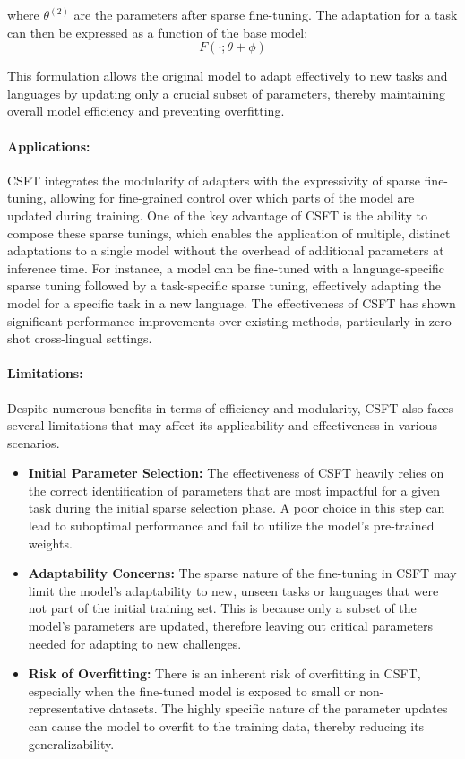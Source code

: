 where $\theta^{(2)}$ are the parameters after sparse fine-tuning. The adaptation for a task can then be expressed as a function of the base model:
\begin{equation}
	F(\cdot; \theta + \phi)
\end{equation}

This formulation allows the original model to adapt effectively to new tasks and languages by updating only a crucial subset of parameters, thereby maintaining overall model efficiency and preventing overfitting.

\paragraph{Applications:} CSFT integrates the modularity of adapters with the expressivity of sparse fine-tuning, allowing for fine-grained control over which parts of the model are updated during training. One of the key advantage of CSFT is the ability to compose these sparse tunings, which enables the application of multiple, distinct adaptations to a single model without the overhead of additional parameters at inference time. For instance, a model can be fine-tuned with a language-specific sparse tuning followed by a task-specific sparse tuning, effectively adapting the model for a specific task in a new language. The effectiveness of CSFT has shown significant performance improvements over existing methods, particularly in zero-shot cross-lingual settings. 

\paragraph{Limitations:} Despite numerous benefits in terms of efficiency and modularity, CSFT also faces several limitations that may affect its applicability and effectiveness in various scenarios. 
\begin{itemize}
	\item \textbf{Initial Parameter Selection:} The effectiveness of CSFT heavily relies on the correct identification of parameters that are most impactful for a given task during the initial sparse selection phase. A poor choice in this step can lead to suboptimal performance and fail to utilize the model's pre-trained weights.

	\item \textbf{Adaptability Concerns:} The sparse nature of the fine-tuning in CSFT may limit the model's adaptability to new, unseen tasks or languages that were not part of the initial training set. This is because only a subset of the model's parameters are updated, therefore leaving out critical parameters needed for adapting to new challenges.
	\item \textbf{Risk of Overfitting:} There is an inherent risk of overfitting in CSFT, especially when the fine-tuned model is exposed to small or non-representative datasets. The highly specific nature of the parameter updates can cause the model to overfit to the training data, thereby reducing its generalizability.
\end{itemize}

